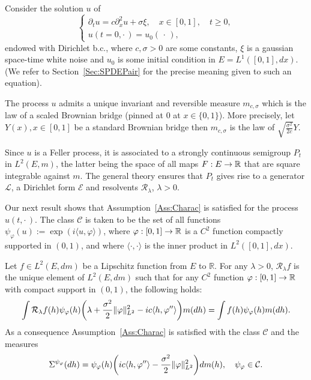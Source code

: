 \documentclass[AHL,Unicode,longabstracts]{cedram}
\theoremstyle{plain}
\newcommand{\cC}{\mathcal{C}}
\newcommand{\cE}{\mathcal{E}}
\newcommand{\cL}{\mathcal{L}}
\newcommand{\cR}{\mathcal{R}}
\newcommand{\R}{\mathbb{R}}
\let\originalleft\left
\let\originalright\right
\renewcommand{\left}{\mathopen{}\mathclose\bgroup\originalleft}
\renewcommand{\right}{\aftergroup\egroup\originalright}
\renewcommand*{\to}{\mathchoice{\longrightarrow}{\rightarrow}{\rightarrow}{\rightarrow}}
\begin{document}
Consider the solution $u$ of
\begin{equation}\label{Eq:SPDEZRP}
\begin{cases} \partial_t u = c\partial_x^2 u + \sigma {\xi},\quad x\in [0,1],\quad t\ge 0,\\
u(t=0,\cdot\,) = u_0(\,\cdot\,),
\end{cases}
\end{equation}
endowed with Dirichlet b.c., where $c,\sigma>0$ are some constants, ${\xi}$ is a gaussian space-time white noise and $u_0$ is some initial condition in $E=L^1([0,1],dx)$. (We refer to Section~\ref{Sec:SPDEPair} for the precise meaning given to such an equation).

The process $u$ admits a unique invariant and reversible measure $m_{c,\sigma}$ which is the law of a scaled Brownian bridge (pinned at $0$ at $x \in\{0,1\}$). More precisely, let $Y(x),x\in [0,1]$ be a standard Brownian bridge then $m_{c,\sigma}$ is the law of $\sqrt{\frac{\sigma^2}{2c}} Y$.

Since $u$ is a Feller process, it is associated to a strongly continuous semigroup $P_t$ in $L^2(E,m)$, the latter being the space of all maps $F:E \to\R$ that are square integrable against $m$. The general theory ensures that $P_t$ gives rise to a generator $\cL$, a Dirichlet form $\cE$ and resolvents $\cR_\lambda$, $\lambda > 0$.

Our next result shows that Assumption~\ref{Ass:Charac} is satisfied for the process $u(t,\cdot\,)$. The class $\cC$ is taken to be the set of all functions $\psi_\varphi(u) := \exp(i \langle u,\varphi\rangle)$, where $\varphi:[0,1]\to\R$ is a $C^2$ function compactly supported in $(0,1)$, and where $\langle \cdot, \cdot \rangle$ is the inner product in $L^2([0,1],dx)$.

\begin{prop}\label{Prop:ZRPCharact}
Let $f\in L^2(E,dm)$ be a Lipschitz function from $E$ to $\R$. For any $\lambda > 0$, $\cR_\lambda f$ is the unique element of $L^2(E,dm)$ such that for any $C^2$ function $\varphi:[0,1]\to\R$ with compact support in $(0,1)$, the following holds:
\begin{equation}\label{Eq:CharactResolZRP}
\int \cR_\lambda f(h) \psi_\varphi(h) \left(\lambda +\frac{\sigma^2}{2} \| \varphi\|_{L^2}^2 - ic \langle h,\varphi''\rangle \right) m(dh) = \int f(h) \psi_\varphi(h) m(dh).
\end{equation}
As a consequence Assumption~\ref{Ass:Charac} is satisfied with the class $\cC$ and the measures
\begin{equation}\label{Eq:SigmaZRP}
\Sigma^{\psi_\varphi}(dh) = \psi_\varphi(h)\left(ic \langle h,\varphi''\rangle -\frac{\sigma^2}{2} \| \varphi\|_{L^2}^2 \right) dm(h),\quad \psi_\varphi \in \cC.
\end{equation}
\end{prop}
\end{document}
